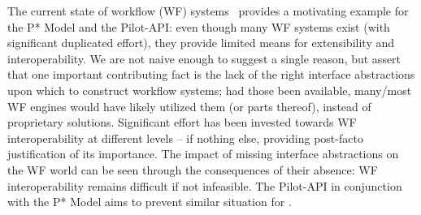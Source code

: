\documentclass[conference]{IEEEtran}
\begin{document}

The current state of workflow (WF) systems~\cite{nsf-workflow,1196459}
provides a motivating example for the P* Model and the Pilot-API:
even though many WF systems exist (with significant duplicated
effort), they provide limited means for extensibility and
interoperability.  We are not naive enough to suggest a single reason,
but assert that one important contributing fact is the lack of the
right interface abstractions upon which to construct workflow systems;
had those been available, many/most WF engines would have likely
utilized them (or parts thereof), instead of proprietary solutions.
%
%
Significant effort has been invested towards WF interoperability at
different levels -- if nothing else, providing post-facto
justification of its importance. The impact of missing interface
abstractions on the WF world can be seen through the consequences of
their absence: WF interoperability remains difficult if not
infeasible. The Pilot-API in conjunction with the P* Model aims to
prevent similar situation for \pilotjobs.



% 

\end{document}
